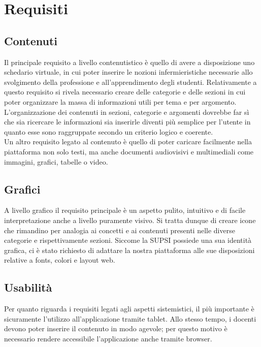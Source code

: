 \documentclass[twoside]{supsistudent}
\begin{document}
\section{Requisiti}

\subsection{Contenuti}
Il principale requisito a livello contenutistico è quello di avere a disposizione uno schedario virtuale, in cui poter inserire le nozioni infermieristiche necessarie allo svolgimento della professione e all’apprendimento degli studenti. Relativamente a questo requisito si rivela necessario creare delle categorie e delle sezioni in cui poter organizzare la massa di informazioni utili per tema e per argomento. L’organizzazione dei contenuti in sezioni, categorie e argomenti dovrebbe far sì che sia ricercare le informazioni sia inserirle diventi più semplice per l’utente in quanto esse sono raggruppate secondo un criterio logico e coerente.\\
Un altro requisito legato al contenuto è quello di poter caricare facilmente nella piattaforma non solo testi, ma anche documenti audiovisivi e multimediali come immagini, grafici, tabelle o video.

\subsection{Grafici}
A livello grafico il requisito principale è un aspetto pulito, intuitivo e di facile interpretazione anche a livello puramente visivo. Si tratta dunque di creare icone che rimandino per analogia ai concetti e ai contenuti presenti nelle diverse categorie e rispettivamente sezioni. Siccome la SUPSI possiede una sua identità grafica, ci è stato richiesto di adattare la nostra piattaforma alle sue disposizioni relative a fonts, colori e layout web.

\subsection{Usabilità}
Per quanto riguarda i requisiti legati agli aspetti sistemistici, il più importante è sicuramente l’utilizzo all’applicazione tramite tablet. Allo stesso tempo, i docenti devono poter inserire il contenuto in modo agevole; per questo motivo è necessario rendere accessibile l'applicazione anche tramite browser.\\\\
\end{document}
